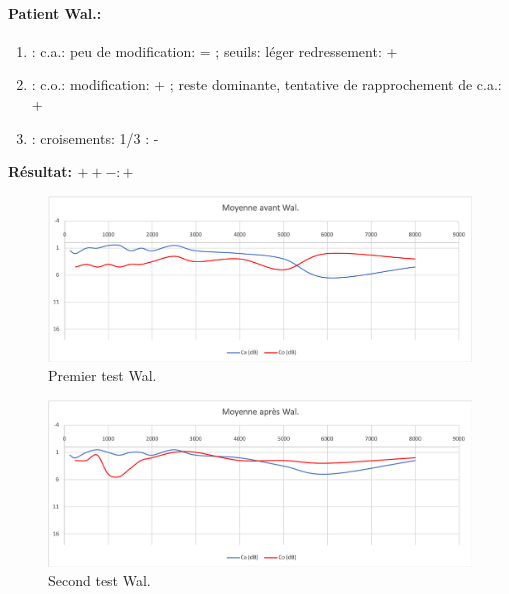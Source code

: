 \paragraph{ Patient Wal.:}


	\begin{enumerate}

 		\item : c.a.: peu de modification: = ;  seuils: léger redressement: +

 		\item : c.o.:  modification:  + ; reste dominante, tentative de rapprochement de c.a.: +
 		\item : croisements: 1/3 :  -

                \end{enumerate}

                \textbf{ Résultat:  $ + +  -        : +$ }
\begin{figure}[th]
	\centering
	\includegraphics[width=1\linewidth]{images/graphiques/wal_pre.png}
	\caption[Patient Wal. :1° test]{Premier test Wal.}
	
\end{figure}
               \begin{figure}%
\centering
\includegraphics[width=1\linewidth]{images/graphiques/wal_post.png}
\caption[Patient Wal. : 2° test]{Second test Wal.}

\label{groupecontroleimage1}
\end{figure}





